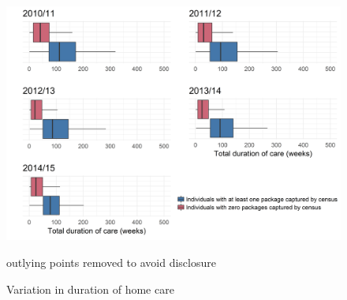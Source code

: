 \documentclass[]{article}
\begin{document}
\begin{figure}[h]
  \centering
    \includegraphics{figures/chapter-renf/17-duration.png}
    \caption{Variation in duration of home care}
    {\scriptsize outlying points removed to avoid disclosure}
    \label{fig:renf-duration}
\end{figure}
\end{document}

